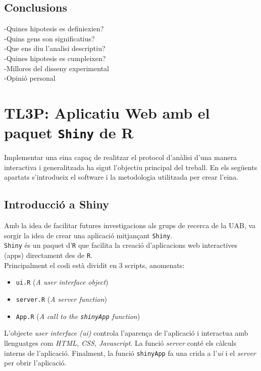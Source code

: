 \documentclass[english]{article}
\begin{document}
\subsection{Conclusions}
-Quines hipotesis es definiexien?\\
-Quins gens son significatius?\\
-Que ens diu l'analisi descriptiu?\\
-Quines hipotesis es cumpleixen?\\
-Millores del disseny experimental\\
-Opinió personal\\
\clearpage
\section{TL3P: Aplicatiu Web amb el paquet \texttt{Shiny} de R}
Implementar una eina capa\c{c} de realitzar el protocol d'anàlisi d'una manera interactiva i generalitzada ha sigut l'objectiu principal del treball. En els següents apartats s'introdueix el software i la metodologia utilitzada per crear l'eina.
\subsection{Introducció a Shiny}
Amb la idea de facilitar futures investigacions als grups de recerca de la UAB, va sorgir la idea de crear una aplicació mitjan\c{c}ant \texttt{Shiny}.
\\

\texttt{Shiny} és un paquet d'\texttt{R} que facilita la creació d'aplicacions web interactives (apps) directament des de \texttt{R}.
\\

Principalment el codi està dividit en 3 scripts, anomenats:
\begin{itemize}
\item \texttt{ui.R} (\textit{A user interface object})
\item \texttt{server.R} (\textit{A server function})
\item \texttt{App.R} (\textit{A call to the \texttt{shinyApp} function})
\end{itemize}
L'objecte \textit{user interface (ui)} controla l'aparen\c{c}a de l'aplicació i interactua amb llenguatges com \textit{HTML, CSS, Javascript}. La funció \textit{server} conté els càlculs interns de l'aplicació. Finalment, la funció \texttt{shinyApp} fa una crida a l'\textit{ui} i el \textit{server} per obrir l'aplicació.
\\
\end{document}
